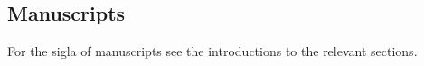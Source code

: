 \DeclareRobustCommand{\AM}{%
	\textbf{\textup{A}}%
}
\DeclareRobustCommand{\AMb}{%
	\textbf{\textup{A\textsubscript{b}}}%
}
\DeclareRobustCommand{\BeoMS}{%
	\textbf{\textup{N}}%
}
\DeclareRobustCommand{\CottonHeli}{%
	\textbf{\textup{C}}%
}
\DeclareRobustCommand{\EddaBms}{%
	\textbf{\textup{B}}%
}
\DeclareRobustCommand{\EddaCms}{%
	\textbf{\textup{C}}%
}
\DeclareRobustCommand{\ExeterBook}{%
	\textbf{\textup{E}}%
}
\DeclareRobustCommand{\FlatMS}{%
	\textbf{\textup{F}}%
}
\DeclareRobustCommand{\GylfMS}{%
	\textbf{\textup{G}}%
}
\DeclareRobustCommand{\Hauksbok}{%
	\textbf{\textup{H}}%
}
\DeclareRobustCommand{\MonacHeli}{%
	\textbf{\textup{M}}%
}
\DeclareRobustCommand{\VolsungaMS}{%
	\textbf{\textup{N}}%
}
\DeclareRobustCommand{\Regius}{%
	\textbf{\textup{R}}%
}
\DeclareRobustCommand{\RegiusProse}{%
	\textbf{\textup{S}}%
}
\DeclareRobustCommand{\SFragHeli}{%
	\textbf{\textup{S}}%
}
\DeclareRobustCommand{\Trajectinus}{%
	\textbf{\textup{T}}%
}
\DeclareRobustCommand{\Wormianus}{%
	\textbf{\textup{W}}%
}
\DeclareRobustCommand{\Upsaliensis}{%
	\textbf{\textup{U}}%
}
\DeclareRobustCommand{\Vaticanus}{%
	\textbf{\textup{V}}%
}
\DeclareRobustCommand{\HildMS}{%
	\textbf{\textup{K}}%
}

\subsection{Manuscripts}
For the sigla of manuscripts see the introductions to the relevant sections.

\newcommand{\Drottkvett}{%
	Court-spoken meter%
}
\newcommand{\Fornyrdislag}{%
	Ancient-words-lay%
}
\newcommand{\Galdralag}{%
	Galders-lay%
}
\newcommand{\Ljodahattr}{%
	Leeds-meter%
}
\newcommand{\Kviduhattr}{%
	Lay-meter%
}
\newcommand{\Malahattr}{%
	Speeches-meter%
}
